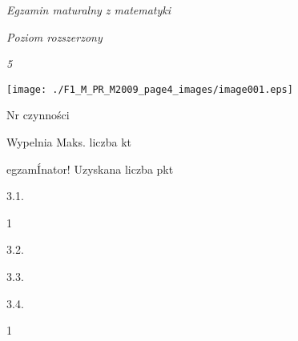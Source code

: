 \documentclass[a4paper,12pt]{article}
\begin{document}
{\it Egzamin maturalny z matematyki}

{\it Poziom rozszerzony}

{\it 5}
\begin{center}
\texttt{[image: ./F1\_M\_PR\_M2009\_page4\_images/image001.eps]}
\end{center}
Nr czynności

Wypelnia Maks. liczba kt

egzamÍnator! Uzyskana liczba pkt

3.1.

1

3.2.

3.3.

3.4.

1
\end{document}
